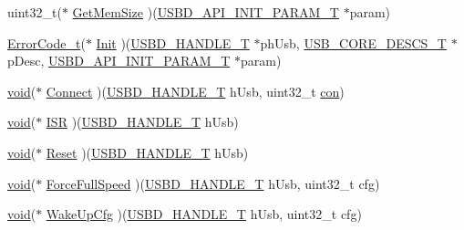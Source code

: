 \begin{DoxyCompactItemize}
\item 
uint32\-\_\-t($\ast$ \hyperlink{structUSBD__HW__API_a59a65bd037723d735b684c308d99fc54}{Get\-Mem\-Size} )(\hyperlink{group__USBD__Core_gaa6e8171941c1ae63afed95974e0f18e3}{U\-S\-B\-D\-\_\-\-A\-P\-I\-\_\-\-I\-N\-I\-T\-\_\-\-P\-A\-R\-A\-M\-\_\-\-T} $\ast$param)
\item 
\hyperlink{error_8h_a905255056c349318139d94aa4523d516}{Error\-Code\-\_\-t}($\ast$ \hyperlink{structUSBD__HW__API_adfa3d0348994e49354243951f2ac95c9}{Init} )(\hyperlink{group__USBD__Core_gafdbb2204d929cb9d75736bd2b42342ac}{U\-S\-B\-D\-\_\-\-H\-A\-N\-D\-L\-E\-\_\-\-T} $\ast$ph\-Usb, \hyperlink{group__USBD__Core_gabdc617d119eac0555f91bea957c41ecc}{U\-S\-B\-\_\-\-C\-O\-R\-E\-\_\-\-D\-E\-S\-C\-S\-\_\-\-T} $\ast$p\-Desc, \hyperlink{group__USBD__Core_gaa6e8171941c1ae63afed95974e0f18e3}{U\-S\-B\-D\-\_\-\-A\-P\-I\-\_\-\-I\-N\-I\-T\-\_\-\-P\-A\-R\-A\-M\-\_\-\-T} $\ast$param)
\item 
\hyperlink{Paradigm_2Tern__EE_2small_2portmacro_8h_a14d32f8130d3c0b212cfc751730b5b49}{void}($\ast$ \hyperlink{structUSBD__HW__API_a0aa79cfec1d36414f1cbc3268b96cb19}{Connect} )(\hyperlink{group__USBD__Core_gafdbb2204d929cb9d75736bd2b42342ac}{U\-S\-B\-D\-\_\-\-H\-A\-N\-D\-L\-E\-\_\-\-T} h\-Usb, uint32\-\_\-t \hyperlink{adn4604_8c_a3552973c8c761ba5a22f86d0d6ab8664}{con})
\item 
\hyperlink{Paradigm_2Tern__EE_2small_2portmacro_8h_a14d32f8130d3c0b212cfc751730b5b49}{void}($\ast$ \hyperlink{structUSBD__HW__API_a692e7cd9ee17c66281daad517ab5636d}{I\-S\-R} )(\hyperlink{group__USBD__Core_gafdbb2204d929cb9d75736bd2b42342ac}{U\-S\-B\-D\-\_\-\-H\-A\-N\-D\-L\-E\-\_\-\-T} h\-Usb)
\item 
\hyperlink{Paradigm_2Tern__EE_2small_2portmacro_8h_a14d32f8130d3c0b212cfc751730b5b49}{void}($\ast$ \hyperlink{structUSBD__HW__API_a1d4278c750d621f59f3b25c28c46c263}{Reset} )(\hyperlink{group__USBD__Core_gafdbb2204d929cb9d75736bd2b42342ac}{U\-S\-B\-D\-\_\-\-H\-A\-N\-D\-L\-E\-\_\-\-T} h\-Usb)
\item 
\hyperlink{Paradigm_2Tern__EE_2small_2portmacro_8h_a14d32f8130d3c0b212cfc751730b5b49}{void}($\ast$ \hyperlink{structUSBD__HW__API_ac4a7b25e6c9ccede46fc9b8185325e39}{Force\-Full\-Speed} )(\hyperlink{group__USBD__Core_gafdbb2204d929cb9d75736bd2b42342ac}{U\-S\-B\-D\-\_\-\-H\-A\-N\-D\-L\-E\-\_\-\-T} h\-Usb, uint32\-\_\-t cfg)
\item 
\hyperlink{Paradigm_2Tern__EE_2small_2portmacro_8h_a14d32f8130d3c0b212cfc751730b5b49}{void}($\ast$ \hyperlink{structUSBD__HW__API_a9b6402065d4944bbd58235202fbd979f}{Wake\-Up\-Cfg} )(\hyperlink{group__USBD__Core_gafdbb2204d929cb9d75736bd2b42342ac}{U\-S\-B\-D\-\_\-\-H\-A\-N\-D\-L\-E\-\_\-\-T} h\-Usb, uint32\-\_\-t cfg)

\end{DoxyCompactItemize}
